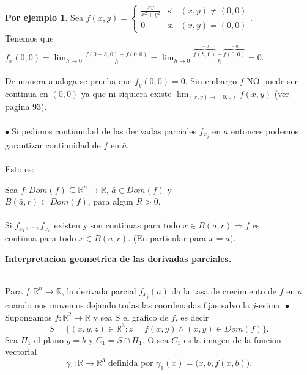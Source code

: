 \documentclass{article}
\theoremstyle{definition}
\newtheorem*{ej}{Por ejemplo}
\theoremstyle{remark}
\newcommand\bl{$\bullet\;$}
\begin{document}
\begin{ej}
  Sea $f(x,y) = \left\{\begin{array}{ccl}
      \frac{xy}{x^2+y^2} & \text{si} & (x,y) \neq (0,0) \\
      0 & \text{si} & (x,y)=(0,0)
  \end{array}\right..$ \\
  Tenemos que $f_x(0,0)=\lim_{h \to 0}{\frac{f(0+h,0)-f(0,0)}{h}}=\lim_{h \to 0}{\frac{\overbrace{f(h,0)}^{= 0}-\overbrace{f(0,0)}^{= 0}}{h}}=0.$\\\\ De manera analoga se prueba que $f_y(0,0)=0$. Sin embargo $f$ NO puede ser continua en $(0,0)$ ya que ni siquiera existe $\lim_{(x,y) \to (0,0)}{f(x,y)}$ \quad (ver pagina 93). \\\\ 
  \bl Si pedimos continuidad de las derivadas parciales $f_{x_j}$ en $\bar{a}$ entonces podemos garantizar continuidad de $f$ en $\bar{a}$. \\\\ Esto es: 
\end{ej}
\begin{teo}
  Sea $f:Dom(f) \subseteq \mathbb{R}^n \to \mathbb{R}$, $\bar{a} \in Dom(f)$ y \\ $B(\bar{a},r) \subset Dom(f)$, para algun $R>0$. \\\\ Si $f_{x_1}, \dots, f_{x_n}$ existen y son continuas para todo $\bar{x} \in B(\bar{a},r) \Rightarrow f$ es\\ continua para todo $\bar{x} \in B(\bar{a},r).$ \quad (En particular para $\bar{x}=\bar{a}$).
\end{teo}
\pagebreak
\begin{center}
\textbf{Interpretacion geometrica de las derivadas parciales.}
\end{center}
\begin{figure}[h]
\centering
\def\svgwidth{1\textwidth}

\end{figure} \; \\
Para $f : \mathbb{R}^n \to \mathbb{R}$, la derivada parcial $f_{x_j}(\bar{a})$ da la tasa de crecimiento de $f$ en $\bar{a}$ cuando nos movemos dejando todas las coordenadas fijas salvo la $j$-esima.
\pagebreak
\textcolor{rojop2}{\bl} Supongamos $f : \mathbb{R}^2 \to \mathbb{R}$ y sea $S$ el grafico de $f$, es decir \[
  S= \big\{(x,y,z) \in \mathbb{R}^3 : z=f(x,y) \land (x,y) \in Dom(f)\big\}.
\] 
Sea $\Pi_1$ el plano $y=b$ \; y \; $C_1=S \cap \Pi_1$. O sea $C_1$ es la imagen de la funcion vectorial \[ 
  \gamma_1 : \mathbb{R} \to \mathbb{R}^3 \text{ definida por } \gamma_1(x) = \big(x,b,f(x,b)\big).
\] 
\end{document}
